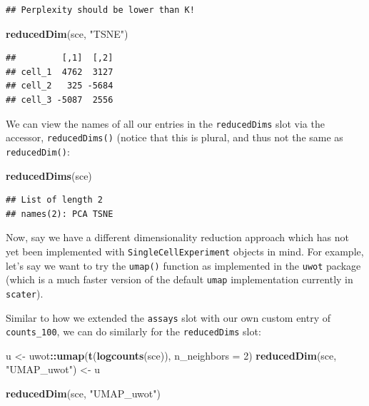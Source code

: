 \documentclass[]{book}
\newenvironment{Shaded}{\begin{snugshade}}{\end{snugshade}}
\newcommand{\DataTypeTok}[1]{\textcolor[rgb]{0.13,0.29,0.53}{#1}}
\newcommand{\DecValTok}[1]{\textcolor[rgb]{0.00,0.00,0.81}{#1}}
\newcommand{\KeywordTok}[1]{\textcolor[rgb]{0.13,0.29,0.53}{\textbf{#1}}}
\newcommand{\NormalTok}[1]{#1}
\newcommand{\OperatorTok}[1]{\textcolor[rgb]{0.81,0.36,0.00}{\textbf{#1}}}
\newcommand{\StringTok}[1]{\textcolor[rgb]{0.31,0.60,0.02}{#1}}
\begin{document}
\begin{verbatim}
## Perplexity should be lower than K!
\end{verbatim}

\begin{Shaded}
\begin{Highlighting}[]
\KeywordTok{reducedDim}\NormalTok{(sce, }\StringTok{"TSNE"}\NormalTok{)}
\end{Highlighting}
\end{Shaded}

\begin{verbatim}
##         [,1]  [,2]
## cell_1  4762  3127
## cell_2   325 -5684
## cell_3 -5087  2556
\end{verbatim}

We can view the names of all our entries in the \texttt{reducedDims} slot via the accessor, \texttt{reducedDims()} (notice that this is plural, and thus not the same as \texttt{reducedDim()}:

\begin{Shaded}
\begin{Highlighting}[]
\KeywordTok{reducedDims}\NormalTok{(sce)}
\end{Highlighting}
\end{Shaded}

\begin{verbatim}
## List of length 2
## names(2): PCA TSNE
\end{verbatim}

Now, say we have a different dimensionality reduction approach which has not yet been implemented with \texttt{SingleCellExperiment} objects in mind. For example, let's say we want to try the \texttt{umap()} function as implemented in the \texttt{uwot} package (which is a much faster version of the default \texttt{umap} implementation currently in \texttt{scater}).

Similar to how we extended the \texttt{assays} slot with our own custom entry of \texttt{counts\_100}, we can do similarly for the \texttt{reducedDims} slot:

\begin{Shaded}
\begin{Highlighting}[]
\NormalTok{u <-}\StringTok{ }\NormalTok{uwot}\OperatorTok{::}\KeywordTok{umap}\NormalTok{(}\KeywordTok{t}\NormalTok{(}\KeywordTok{logcounts}\NormalTok{(sce)), }\DataTypeTok{n_neighbors =} \DecValTok{2}\NormalTok{)}
\KeywordTok{reducedDim}\NormalTok{(sce, }\StringTok{"UMAP_uwot"}\NormalTok{) <-}\StringTok{ }\NormalTok{u}

\KeywordTok{reducedDim}\NormalTok{(sce, }\StringTok{"UMAP_uwot"}\NormalTok{)}
\end{Highlighting}
\end{Shaded}
\end{document}
